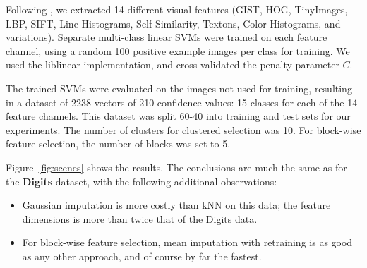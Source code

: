 Following \parencite{Xiao-CVPR-2010}, we extracted 14 different visual features (GIST, HOG, TinyImages, LBP, SIFT, Line Histograms, Self-Similarity, Textons, Color Histograms, and variations).
Separate multi-class linear SVMs were trained on each feature channel, using a random 100 positive example images per class for training.
We used the liblinear implementation, and cross-validated the penalty parameter $C$.

The trained SVMs were evaluated on the images not used for training, resulting in a dataset of 2238 vectors of 210 confidence values: 15 classes for each of the 14 feature channels.
This dataset was split 60-40 into training and test sets for our experiments.
The number of clusters for clustered selection was 10.
For block-wise feature selection, the number of blocks was set to 5.

Figure~\ref{fig:scenes} shows the results.
The conclusions are much the same as for the \textbf{Digits} dataset, with the following additional observations:
\begin{itemize}
\item Gaussian imputation is more costly than kNN on this data; the feature dimensions is more than twice that of the Digits data.
\item For block-wise feature selection, mean imputation with retraining is as good as any other approach, and of course by far the fastest.
\end{itemize}

